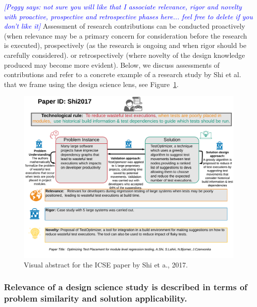 \documentclass[graybox]{svmult}
\newcommand{\peggy}[1]{\textcolor{blue}{{\it [Peggy says: #1]}}}
\newcommand{\peggy}[1]{}
\begin{document}
\peggy{not sure you will like that I associate relevance, rigor and novelty with proactive, prospective and retrospective phases here... feel free to delete if you don't like it}
Assessment of research contributions can be conducted proactively (when relevance may be a primary concern for consideration before the research is executed), prospectively (as the research is ongoing and when rigor should be carefully considered). or retrospectively (where novelty of the design knowledge produced may become more evident).
Below, we discuss assessments of contributions and refer to a concrete example of a research study by Shi et al.~\cite{Shi2017} that we frame using the design science lens, see Figure~\ref{fig:VA-example}. 


\begin{figure}
  \includegraphics[width=1.0\textwidth]{Figures/Shi2017.png}
\caption{Visual abstract for the ICSE paper by Shi et a., 2017.}
\label{fig:VA-example}       %
\end{figure}



\subsubsection{Relevance of a design science study is described in terms of problem similarity and solution applicability.} 
\end{document}
